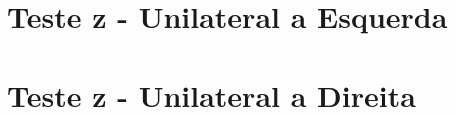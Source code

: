 \documentclass{article}
\begin{document}


\section{Teste z - Unilateral a Esquerda}

% 
% 
% 
% 
% 

\section{Teste z - Unilateral a Direita}
\end{document}
